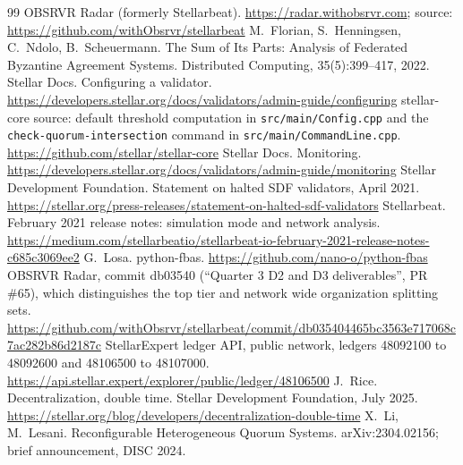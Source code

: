 \documentclass[11pt,a4paper]{article}
\begin{document}
\begin{thebibliography}{99}
\setlength{\itemsep}{1pt}
 OBSRVR Radar (formerly Stellarbeat). \url{https://radar.withobsrvr.com}; source: \url{https://github.com/withObsrvr/stellarbeat}
 M.~Florian, S.~Henningsen, C.~Ndolo, B.~Scheuermann. The Sum of Its Parts: Analysis of Federated Byzantine Agreement Systems. Distributed Computing, 35(5):399--417, 2022.
 Stellar Docs. Configuring a validator. \url{https://developers.stellar.org/docs/validators/admin-guide/configuring}
 stellar-core source: default threshold computation in \texttt{src/main/Config.cpp} and the \texttt{check-quorum-intersection} command in \texttt{src/main/CommandLine.cpp}. \url{https://github.com/stellar/stellar-core}
 Stellar Docs. Monitoring. \url{https://developers.stellar.org/docs/validators/admin-guide/monitoring}
 Stellar Development Foundation. Statement on halted SDF validators, April 2021. \url{https://stellar.org/press-releases/statement-on-halted-sdf-validators}
 Stellarbeat. February 2021 release notes: simulation mode and network analysis. \url{https://medium.com/stellarbeatio/stellarbeat-io-february-2021-release-notes-c685c3069ee2}
 G.~Losa. python-fbas. \url{https://github.com/nano-o/python-fbas}
 OBSRVR Radar, commit db03540 (``Quarter 3 D2 and D3 deliverables'', PR \#65), which distinguishes the top tier and network wide organization splitting sets. \url{https://github.com/withObsrvr/stellarbeat/commit/db035404465bc3563e717068c7ac282b86d2187c}
 StellarExpert ledger API, public network, ledgers 48092100 to 48092600 and 48106500 to 48107000. \url{https://api.stellar.expert/explorer/public/ledger/48106500}
 J.~Rice. Decentralization, double time. Stellar Development Foundation, July 2025. \url{https://stellar.org/blog/developers/decentralization-double-time}
 X.~Li, M.~Lesani. Reconfigurable Heterogeneous Quorum Systems. arXiv:2304.02156; brief announcement, DISC 2024.
\end{thebibliography}
\end{document}
